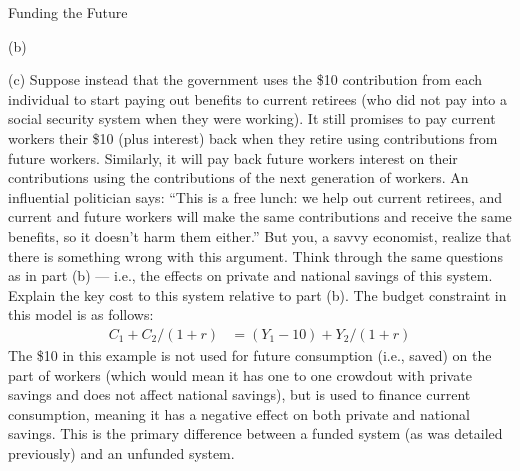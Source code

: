 \documentclass[8pt]{extarticle}
\begin{document}
\begin{problem}{Funding the Future}
\begin{problem}{(b)}
    \end{problem}
    \begin{problem}{(c)}
      Suppose instead that the government uses the \$10 contribution from each individual to start paying out benefits to current retirees (who did not pay into a social security system when they were working). It still promises to pay current workers their \$10 (plus interest) back when they retire using contributions from future workers. Similarly, it will pay back future workers interest on their contributions using the contributions of the next generation of workers. An influential politician says: ``This is a free lunch: we help out current retirees, and current and future workers will make the same contributions and receive the same benefits, so it doesn't harm them either.'' But you, a savvy economist, realize that there is something wrong with this argument. Think through the same questions as in part (b) --- i.e., the effects on private and national savings of this system. Explain the key cost to this system relative to part (b).
      \tcblower
      The budget constraint in this model is as follows:
      \begin{align*}
        C_1 + C_2/(1+r) &= \left(Y_1-10\right) + Y_2/(1+r)
      \end{align*}
      The \$10 in this example is not used for future consumption (i.e., saved) on the part of workers (which would mean it has one to one crowdout with private savings and does not affect national savings), but is used to finance current consumption, meaning it has a negative effect on both private and national savings. This is the primary difference between a funded system (as was detailed previously) and an unfunded system.
    \end{problem}
  \end{problem}
\end{document}
